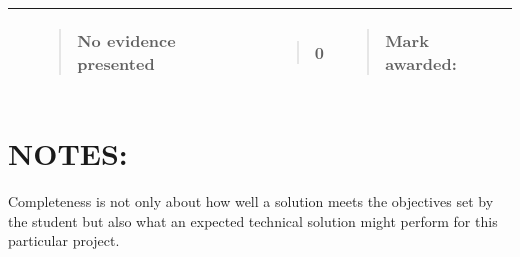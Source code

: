 \documentclass[
]{article}
\begin{document}
\begin{longtable}[]{@{}llll@{}}
\begin{minipage}[t]{0.22\columnwidth}\raggedright
\strut
\end{minipage} & \begin{minipage}[t]{0.22\columnwidth}\raggedright
\begin{quote}
No evidence presented
\end{quote}\strut
\end{minipage} & \begin{minipage}[t]{0.22\columnwidth}\raggedright
\begin{quote}
0
\end{quote}\strut
\end{minipage} & \begin{minipage}[t]{0.22\columnwidth}\raggedright
\begin{quote}
\textbf{Mark awarded:}
\end{quote}\strut
\end{minipage}\tabularnewline
\bottomrule
\end{longtable}

\hypertarget{notes}{%
\section{NOTES:}\label{notes}}

Completeness is not only about how well a solution meets the objectives
set by the student but also what an expected technical solution might
perform for this particular project.
\end{document}
